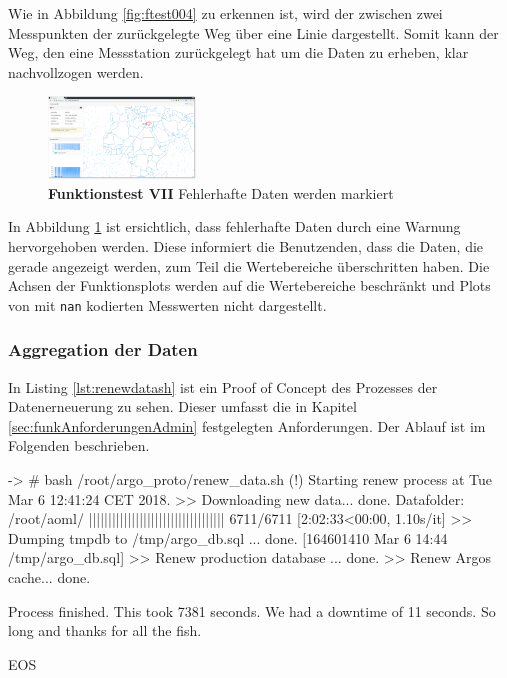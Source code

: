 Wie in Abbildung \ref{fig:ftest004} zu erkennen ist, wird der zwischen zwei Messpunkten der zurückgelegte Weg über eine Linie dargestellt. Somit kann der Weg, den eine Messstation zurückgelegt hat um die Daten zu erheben, klar nachvollzogen werden.
\newline\newline\newline\newline
\newline\newline\newline


\begin{figure}
 \centering
 \includegraphics[width=0.35\textwidth]{pix/ftest/00fail.png}

 \caption{\textbf{Funktionstest VII} Fehlerhafte Daten werden markiert}
 \label{fig:ftest00fail}
\end{figure}

In Abbildung \ref{fig:ftest00fail} ist ersichtlich, dass fehlerhafte Daten durch eine Warnung hervorgehoben werden. Diese informiert die Benutzenden, dass die Daten, die gerade angezeigt werden, zum Teil die Wertebereiche überschritten haben. Die Achsen der Funktionsplots werden auf die Wertebereiche beschränkt und Plots von mit \texttt{\gls{nan}} kodierten Messwerten nicht dargestellt.
\newline
\newline



\subsubsection{Aggregation der Daten}

In Listing \ref{lst:renewdatash} ist ein Proof of Concept des Prozesses der Datenerneuerung zu sehen. Dieser umfasst die in Kapitel \ref{sec:funkAnforderungenAdmin} festgelegten Anforderungen. Der Ablauf ist im Folgenden beschrieben.

\begin{python}[%
        label={lst:renewdatash},%
        caption={Erneuerung des Datensatzes}]
 -> # bash /root/argo_proto/renew_data.sh
(!) Starting renew process at Tue Mar  6 12:41:24 CET 2018.
 >> Downloading new data...
        done.
Datafolder: /root/aoml/
||||||||||||||||||||||||||||||||||| 6711/6711 [2:02:33<00:00,  1.10s/it]
 >> Dumping tmpdb to /tmp/argo_db.sql ...
        done. [164601410 Mar  6 14:44 /tmp/argo_db.sql]
 >> Renew production database ...
        done.
 >> Renew Argos cache...
        done.

Process finished.
This took  7381 seconds.
We had a downtime of 11 seconds.
So long and thanks for all the fish.

    EOS
\end{python}

